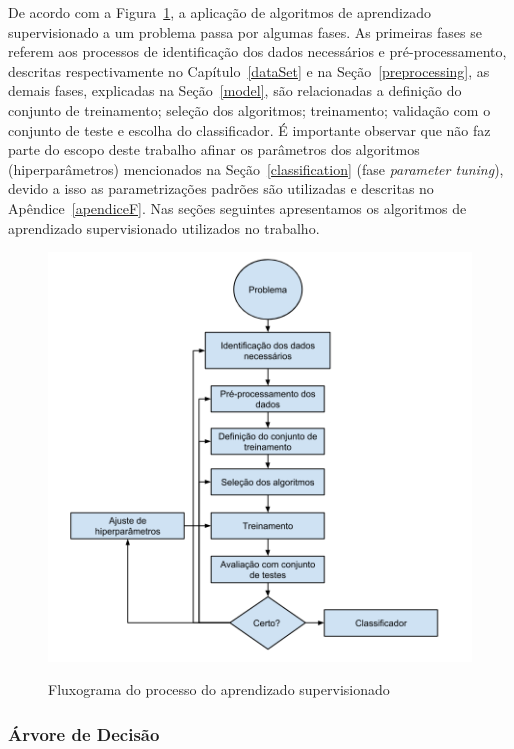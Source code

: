 \documentclass[
	12pt,				%
	oneside,			%
	a4paper,			%
	english,			%
	brazil				%
	]{abntex2ppgsi}
\begin{document}
{De acordo com a Figura~\ref{fig:arch_ml}, a aplicação de algoritmos de aprendizado supervisionado a um problema passa por algumas fases. As primeiras fases se referem aos processos de identificação dos dados necessários e pré-processamento, descritas respectivamente no Capítulo~\ref{dataSet} e na Seção~\ref{preprocessing}, as demais fases, explicadas na Seção~\ref{model}, são relacionadas a definição do conjunto de treinamento; seleção dos algoritmos;  treinamento; validação com o conjunto de teste e escolha do classificador. É importante observar que não faz parte do escopo deste trabalho afinar os parâmetros dos algoritmos (hiperparâmetros) mencionados na Seção~\ref{classification} (fase \textit{parameter tuning}), devido a isso as parametrizações padrões são utilizadas e descritas no Apêndice~\ref{apendiceF}. Nas seções seguintes apresentamos os algoritmos de aprendizado supervisionado utilizados no trabalho.

\begin{figure}[H]%
	\centering
 	  \caption{Fluxograma do processo do aprendizado supervisionado}
		\includegraphics[width=0.8\linewidth]{images/ml_arch_pt.png}
	\label{fig:arch_ml}
\end{figure}

\subsubsection{Árvore de Decisão}

}
\end{document}

